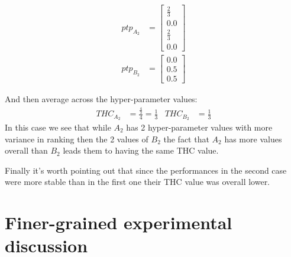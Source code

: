 \begin{enumerate}
\begin{equation*}
\begin{aligned}
        ptp_{A_2} &= \begin{bmatrix}
                    \frac{2}{3} \\
                    0.0 \\
                    \frac{2}{3} \\
                    0.0
                    \end{bmatrix} \\
        ptp_{B_2} &= \begin{bmatrix}
                    0.0\\
                    0.5\\
                    0.5
                    \end{bmatrix}
    \end{aligned}
\end{equation*}

    And then average across the hyper-parameter values:
        \begin{align}
            THC_{A_2} &= \frac{\frac{4}{3}}{4} = \frac{1}{3} & THC_{B_2} &= \frac{1}{3}
        \end{align}
    In this case we see that while $A_2$ has 2 hyper-parameter values with more variance in ranking then the 2 values of $B_2$ the fact that $A_2$ has more values overall than $B_2$ leads them to having the same THC value.
\end{enumerate}

Finally it's worth pointing out that since the performances in the second case were more stable than in the first one their THC value was overall lower. 

\section{Finer-grained experimental discussion}
\label{sec:finerGrainedExperiments}

